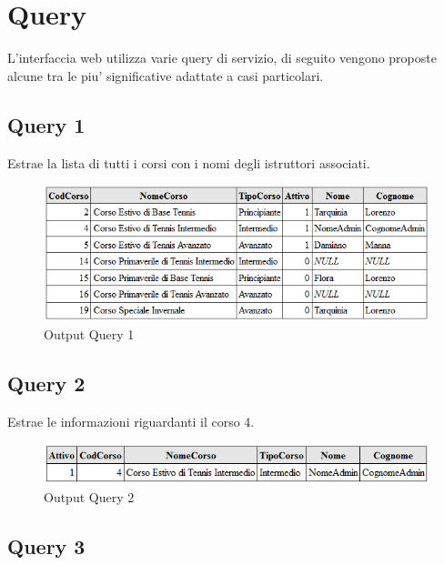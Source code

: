 \chapter{Query} 
L'interfaccia web utilizza varie query di servizio, di seguito vengono proposte alcune tra le piu' significative adattate a casi particolari.

\section{Query 1}

Estrae la lista di tutti i corsi con i nomi degli istruttori associati.\\



\begin{figure}[H]
 \centering
  \includegraphics[width=\textwidth]{images/Query1.PNG}
\caption{Output Query 1}
\end{figure}

\section{Query 2}

Estrae le informazioni riguardanti il corso 4.\\



\begin{figure}[H]
 \centering
  \includegraphics[width=\textwidth]{images/Query2.PNG}
\caption{Output Query 2}
\end{figure}

\section{Query 3}

